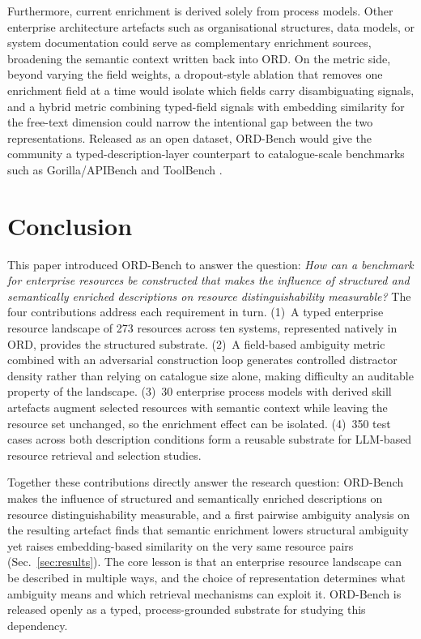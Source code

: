 \documentclass[10pt,twocolumn]{article}
\begin{document}
Furthermore, current enrichment is derived solely from process models. Other enterprise architecture artefacts such as organisational structures, data models, or system documentation could serve as complementary enrichment sources, broadening the semantic context written back into ORD. On the metric side, beyond varying the field weights, a dropout-style ablation that removes one enrichment field at a time would isolate which fields carry disambiguating signals, and a hybrid metric combining typed-field signals with embedding similarity for the free-text dimension could narrow the intentional gap between the two representations. Released as an open dataset, ORD-Bench would give the community a typed-description-layer counterpart to catalogue-scale benchmarks such as Gorilla/APIBench \citep{gonzalez_gorilla_2024} and ToolBench \citep{qin_toolllm_nodate}.




\section{Conclusion}
\label{sec:conclusion}



This paper introduced ORD-Bench to answer the question: \textit{How can a benchmark for enterprise resources be constructed that makes the influence of structured and semantically enriched descriptions on resource distinguishability measurable?} The four contributions address each requirement in turn. (1)~A typed enterprise resource landscape of 273 resources across ten systems, represented natively in ORD, provides the structured substrate. (2)~A field-based ambiguity metric combined with an adversarial construction loop generates controlled distractor density rather than relying on catalogue size alone, making difficulty an auditable property of the landscape. (3)~30 enterprise process models with derived skill artefacts augment selected resources with semantic context while leaving the resource set unchanged, so the enrichment effect can be isolated. (4)~350 test cases across both description conditions form a reusable substrate for LLM-based resource retrieval and selection studies.

Together these contributions directly answer the research question: ORD-Bench makes the influence of structured and semantically enriched descriptions on resource distinguishability measurable, and a first pairwise ambiguity analysis on the resulting artefact finds that semantic enrichment lowers structural ambiguity yet raises embedding-based similarity on the very same resource pairs (Sec.~\ref{sec:results}). The core lesson is that an enterprise resource landscape can be described in multiple ways, and the choice of representation determines what ambiguity means and which retrieval mechanisms can exploit it. ORD-Bench is released openly as a typed, process-grounded substrate for studying this dependency.
\end{document}
